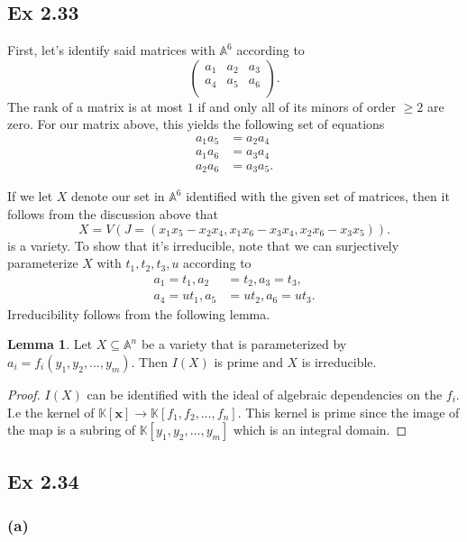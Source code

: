 \documentclass{article}
\theoremstyle{definition}
\newtheorem{lemma}[theorem]{Lemma}
\newcommand{\K}{\mathbb{K}}
\newcommand{\A}{\mathbb{A}}
\newcommand{\Kx}{\K[\bm{x}]}
\newcommand{\An}{\A^n}
\begin{document}
\subsection*{Ex 2.33} 

First, let's identify said matrices with $\A^{6}$ according to
\[
\begin{pmatrix}
	a_1 & a_2 & a_3 \\
	a_4 & a_5 & a_6 \\
\end{pmatrix}.
\] 
The rank of a matrix is at most $1$ if and only all of its minors of 
order $\geq 2$ are zero. For our matrix above, this yields the following
set of equations
\begin{align*}
	a_1 a_5 &= a_2 a_4 \\
	a_1 a_6 &= a_3 a_4 \\
	a_2 a_6 &= a_3 a_5.
\end{align*}

If we let $X$ denote our set in $\A^{6}$ identified with the given set of
matrices, then it follows from the discussion above that 
\[
X = V(J = (x_1x_5 - x_2x_4, x_1x_6 - x_3x_4, x_2x_6 - x_3x_5)).
\] 
is a variety. To show that it's irreducible, note that we can surjectively
parameterize $X$ with $t_1, t_2, t_3, u$ according to 
\begin{align*}
	a_1 = t_1,
	a_2 &= t_2,
	a_3 = t_3, \\
	a_4 = ut_1 ,
	a_5 &= ut_2,
	a_6 = ut_3.
\end{align*}
Irreducibility follows from the following lemma. 
\begin{lemma}
	Let $X \subseteq \An$ be a variety that is parameterized by $a_i = f_i(y_1,
	y_2, \ldots, y_m)$. Then $I(X)$ is prime and $X$ is irreducible.
\end{lemma}
\begin{proof}
	$I(X)$ can be identified with the ideal of algebraic dependencies on the
	$f_i$. I.e the kernel of $\Kx \to \K[f_1, f_2, \ldots, f_n]$. This kernel
	is prime since the image of the map is a subring of $\K[y_1, y_2, \ldots,
	y_m]$ which is an integral domain.
\end{proof}


\subsection*{Ex 2.34} 

\subsubsection*{(a)} 
\end{document}
